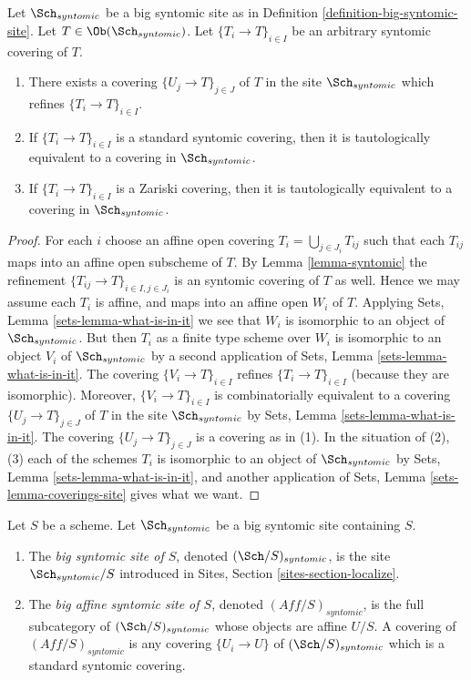 \begin{lemma}
\label{lemma-syntomic-induced}
Let $\Sch_{syntomic}$ be a big syntomic site as in
Definition \ref{definition-big-syntomic-site}.
Let $T \in \Ob(\Sch_{syntomic})$.
Let $\{T_i \to T\}_{i \in I}$ be an arbitrary syntomic covering of $T$.
\begin{enumerate}
\item There exists a covering $\{U_j \to T\}_{j \in J}$ of $T$ in the site
$\Sch_{syntomic}$ which refines $\{T_i \to T\}_{i \in I}$.
\item If $\{T_i \to T\}_{i \in I}$ is a standard syntomic covering, then
it is tautologically equivalent to a covering in $\Sch_{syntomic}$.
\item If $\{T_i \to T\}_{i \in I}$ is a Zariski covering, then
it is tautologically equivalent to a covering in $\Sch_{syntomic}$.
\end{enumerate}
\end{lemma}

\begin{proof}
For each $i$ choose an affine open covering $T_i = \bigcup_{j \in J_i} T_{ij}$
such that each $T_{ij}$ maps into an affine open subscheme of $T$. By
Lemma \ref{lemma-syntomic}
the refinement $\{T_{ij} \to T\}_{i \in I, j \in J_i}$ is an syntomic covering
of $T$ as well. Hence we may assume each $T_i$ is affine, and maps into
an affine open $W_i$ of $T$. Applying
Sets, Lemma \ref{sets-lemma-what-is-in-it}
we see that $W_i$ is isomorphic to an object of $\Sch_{syntomic}$.
But then $T_i$ as a finite type scheme over $W_i$
is isomorphic to an object $V_i$ of $\Sch_{syntomic}$ by a second
application of
Sets, Lemma \ref{sets-lemma-what-is-in-it}.
The covering $\{V_i \to T\}_{i \in I}$ refines $\{T_i \to T\}_{i \in I}$
(because they are isomorphic).
Moreover, $\{V_i \to T\}_{i \in I}$ is combinatorially equivalent to a
covering $\{U_j \to T\}_{j \in J}$ of $T$ in the site
$\Sch_{syntomic}$ by
Sets, Lemma \ref{sets-lemma-what-is-in-it}.
The covering $\{U_j \to T\}_{j \in J}$ is a covering as in (1).
In the situation of (2), (3) each of the
schemes $T_i$ is isomorphic to an object of $\Sch_{syntomic}$ by
Sets, Lemma \ref{sets-lemma-what-is-in-it},
and another application of
Sets, Lemma \ref{sets-lemma-coverings-site}
gives what we want.
\end{proof}

\begin{definition}
\label{definition-big-small-syntomic}
Let $S$ be a scheme. Let $\Sch_{syntomic}$ be a big syntomic
site containing $S$.
\begin{enumerate}
\item The {\it big syntomic site of $S$}, denoted
$(\Sch/S)_{syntomic}$, is the site $\Sch_{syntomic}/S$
introduced in Sites, Section \ref{sites-section-localize}.
\item The {\it big affine syntomic site of $S$}, denoted
$(\textit{Aff}/S)_{syntomic}$, is the full subcategory of
$(\Sch/S)_{syntomic}$ whose objects are affine $U/S$.
A covering of $(\textit{Aff}/S)_{syntomic}$ is any covering
$\{U_i \to U\}$ of $(\Sch/S)_{syntomic}$ which is a
standard syntomic covering.
\end{enumerate}
\end{definition}

